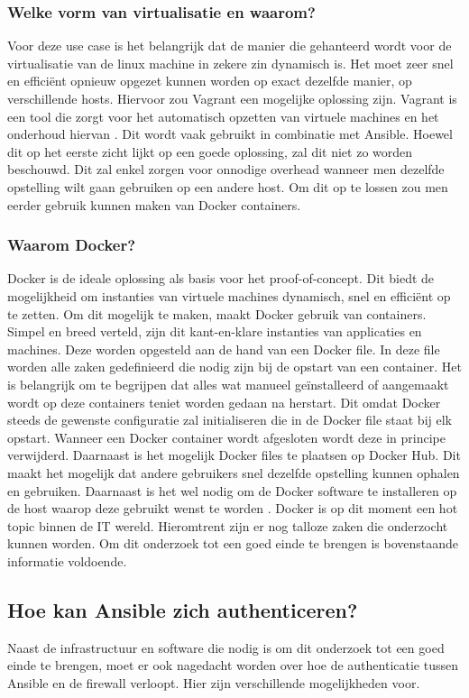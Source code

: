 \subsubsection{Welke vorm van virtualisatie en waarom?}
Voor deze use case is het belangrijk dat de manier die gehanteerd wordt voor de virtualisatie van de linux machine in zekere zin dynamisch is. Het moet zeer snel en efficiënt opnieuw opgezet kunnen worden op exact dezelfde manier, op verschillende hosts. Hiervoor zou Vagrant een mogelijke oplossing zijn. Vagrant is een tool die zorgt voor het automatisch opzetten van virtuele machines en het onderhoud hiervan \autocite{samandal2021}.  Dit wordt vaak gebruikt in combinatie met Ansible. Hoewel dit op het eerste zicht lijkt op een goede oplossing, zal dit niet zo worden beschouwd. Dit zal enkel zorgen voor onnodige overhead wanneer men dezelfde opstelling wilt gaan gebruiken op een andere host. Om dit op te lossen zou men eerder gebruik kunnen maken van Docker containers.

\subsubsection{Waarom Docker?}
Docker is de ideale oplossing als basis voor het proof-of-concept. Dit biedt de mogelijkheid om instanties van virtuele machines dynamisch, snel en efficiënt op te zetten. Om dit mogelijk te maken, maakt Docker gebruik van containers. Simpel en breed verteld, zijn dit kant-en-klare instanties van applicaties en machines. Deze worden opgesteld aan de hand van een Docker file. In deze file worden alle zaken gedefinieerd die nodig zijn bij de opstart van een container. Het is belangrijk om te begrijpen dat alles wat manueel geïnstalleerd of aangemaakt wordt op deze containers teniet worden gedaan na herstart. Dit omdat Docker steeds de gewenste configuratie zal initialiseren die in de Docker file staat bij elk opstart. Wanneer een Docker container wordt afgesloten wordt deze in principe verwijderd. Daarnaast is het mogelijk Docker files te plaatsen op Docker Hub. Dit maakt het mogelijk dat andere gebruikers snel dezelfde opstelling kunnen ophalen en gebruiken. Daarnaast is het wel nodig om de Docker software te installeren op de host waarop deze gebruikt wenst te worden \autocite{Docker}. Docker is op dit moment een hot topic binnen de IT wereld. Hieromtrent zijn er nog talloze zaken die onderzocht kunnen worden. Om dit onderzoek tot een goed einde te brengen is bovenstaande informatie voldoende. 

\subsection{Hoe kan Ansible zich authenticeren?}
Naast de infrastructuur en software die nodig is om dit onderzoek tot een goed einde te brengen, moet er ook nagedacht worden over hoe de authenticatie tussen Ansible en de firewall verloopt. Hier zijn verschillende mogelijkheden voor. 

